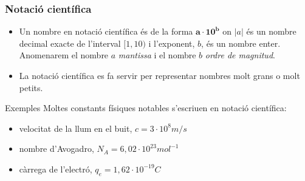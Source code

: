 \documentclass{beamer}
\begin{document}
\begin{frame}\frametitle{Notació científica}
\begin{itemize}
\item Un nombre en notació científica és de la forma
$\mathbf{a\cdot10^{b}}$ on $|a|$ és un nombre decimal exacte de
l'interval $[1,10)$ i l'exponent, $b$, és un nombre enter.
Anomenarem el nombre $a$ \emph{mantissa} i el nombre $b$
\emph{ordre de magnitud}.\pause
\item
La notació científica es fa servir per representar nombres molt
grans o molt petits.
\end{itemize}\pause
\begin{exampleblock}{Exemples}
Moltes constants físiques notables s'escriuen en notació
científica:
\begin{itemize}
\item
velocitat de la llum en el buit, $c=3\cdot10^{8}m/s$
\item
nombre d'Avogadro, $N_{A}=6,02\cdot10^{23} mol^{-1}$
\item
càrrega de l'electró, $q_{e}=1,62\cdot10^{-19}C$
\end{itemize}
\end{exampleblock}
\end{frame}
\end{document}
